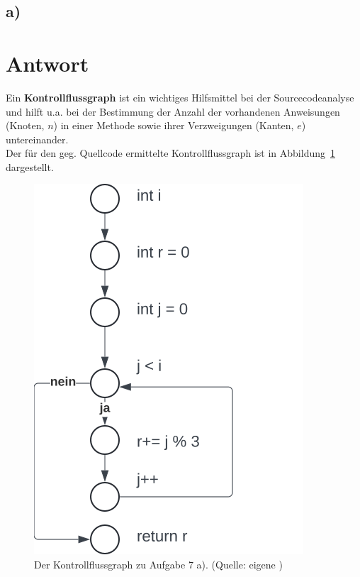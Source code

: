 \subsection*{a)}

\section*{Antwort}

Ein \textbf{Kontrollflussgraph} ist ein wichtiges Hilfsmittel bei der Sourcecodeanalyse und hilft u.a. bei der Bestimmung der Anzahl der vorhandenen Anweisungen (Knoten, $n$) in  einer Methode sowie ihrer Verzweigungen (Kanten, $e$) untereinander.\\
Der für den geg. Quellcode ermittelte Kontrollflussgraph ist in Abbildung~\ref{fig:kontrollflussgraph} dargestellt.

\begin{figure}
    \centering
    \includegraphics[scale=0.6]{chapters/aufgabe 7/img/kontrollflussgraph}
    \caption{Der Kontrollflussgraph zu Aufgabe 7 a). (Quelle: eigene )}
    \label{fig:kontrollflussgraph}
\end{figure}
